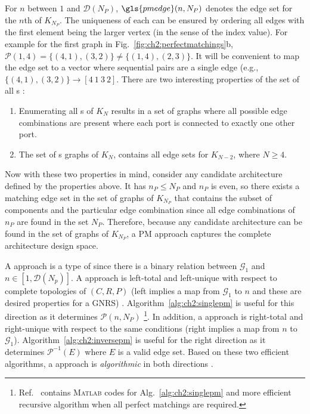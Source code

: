 

For $n$ between $1$ and $\mathcal{D}(N_P)$, $\gls{pmedge}(n,N_P)$ denotes the edge set for the $n$th \mypm{} of $K_{N_P}$. The uniqueness of each \mypm{} can be ensured by ordering all edges with the first element being the larger vertex (in the sense of the index value). For example for the first graph in Fig.~\ref{fig:ch2:perfectmatchings}b, $\mathcal{P}(1,4) = \{ (4,1),(3,2) \} \neq \{ (1,4),(2,3) \}$. It will be convenient to map the edge set to a vector where sequential pairs are a single edge (e.g.,~$\{ (4,1),(3,2) \} \to [4\ 1\ 3\ 2]$. There are two interesting properties of the set of all \mypm{}s \cite{Rispoli2007a}:
\begin{enumerate}[nosep]
\item Enumerating all \mypm{}s of $K_N$ results in a set of graphs where all possible edge combinations are present where each port is connected to exactly one other port.
\item The set of \mypm{}s graphs of $K_N$, contains all edge sets for $K_{N-2}$, where $N \geq 4$.
\end{enumerate}

\noindent Now with these two properties in mind, consider any candidate architecture defined by the properties above. It has $n_P \leq N_P$ and $n_P$ is even, so there exists a \mypm{} matching edge set in the set of \mypm{} graphs of $K_{N_P}$ that contains the subset of components and the particular edge combination since all edge combinations of $n_P$ are found in the set $N_P$. Therefore, because any candidate architecture can be found in the set of \mypm{} graphs of $K_{N_P}$, a PM approach captures the complete architecture design space.

A \mypm{} approach is a type of  since there is a binary relation between $\mathcal{G}_1$ and $n \in [1, \mathcal{D}(N_p)]$. A \mypm{} approach is {left-total} and {left-unique} with respect to complete topologies of $(C,R,P)$ (left implies a map from $\mathcal{G}_1$ to $n$ and these are desired properties for a GNRS) \cite{Wyatt2014a}. Algorithm~\ref{alg:ch2:singlepm} is useful for this direction as it determines $\mathcal{P}(n,N_P)$ \cite{github-pm-architectures-project, Rispoli2007a}\footnote{Ref.~\cite{github-pm-architectures-project} contains \textsc{Matlab} codes for Alg.~\ref{alg:ch2:singlepm} and more efficient recursive algorithm when all perfect matchings are required.
}. In addition, a \mypm{} approach is {right-total} and {right-unique} with respect to the same conditions (right implies a map from $n$ to $\mathcal{G}_1$). Algorithm~\ref{alg:ch2:inversepm} is useful for the right direction as it determines $\mathcal{P}^{-1}(E)$ where $E$ is a valid \mypm{} edge set. Based on these two efficient algorithms, a \mypm{} approach is \textit{algorithmic} in both directions \cite{Wyatt2014a}.

